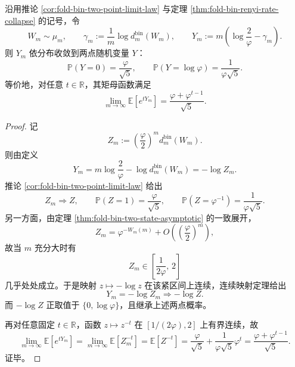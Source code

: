 \begin{theorem}\label{thm:derived-binfold-logfiber-two-point-law}
沿用推论 \ref{cor:fold-bin-two-point-limit-law} 与定理 \ref{thm:fold-bin-renyi-rate-collapse} 的记号，令
\[
W_m\sim \mu_m,
\qquad
\gamma_m:=\frac1m\log d_m^{\mathrm{bin}}(W_m),
\qquad
Y_m:=m\left(\log\frac{2}{\varphi}-\gamma_m\right).
\]
则 \(Y_m\) 依分布收敛到两点随机变量 \(Y\)：
\[
\mathbb P(Y=0)=\frac{\varphi}{\sqrt5},
\qquad
\mathbb P(Y=\log\varphi)=\frac{1}{\varphi\sqrt5}.
\]
等价地，对任意 \(t\in \mathbb R\)，其矩母函数满足
\[
\lim_{m\to\infty}\mathbb E[e^{tY_m}]
=
\frac{\varphi+\varphi^{t-1}}{\sqrt5}.
\]
\end{theorem}
\begin{proof}
记
\[
Z_m:=\left(\frac{\varphi}{2}\right)^m d_m^{\mathrm{bin}}(W_m).
\]
则由定义
\[
Y_m
=
m\log\frac{2}{\varphi}-\log d_m^{\mathrm{bin}}(W_m)
=
-\log Z_m.
\]
推论 \ref{cor:fold-bin-two-point-limit-law} 给出
\[
Z_m\Longrightarrow Z,
\qquad
\mathbb P(Z=1)=\frac{\varphi}{\sqrt5},
\qquad
\mathbb P(Z=\varphi^{-1})=\frac{1}{\varphi\sqrt5}.
\]
另一方面，由定理 \ref{thm:fold-bin-two-state-asymptotic} 的一致展开，
\[
Z_m=\varphi^{-W_m(m)}+O\!\left(\left(\frac{\varphi}{2}\right)^m\right),
\]
故当 \(m\) 充分大时有
\[
Z_m\in \left[\frac{1}{2\varphi},\,2\right]
\]
几乎处处成立。于是映射 \(z\mapsto -\log z\) 在该紧区间上连续，连续映射定理给出
\[
Y_m=-\log Z_m\Longrightarrow -\log Z.
\]
而 \(-\log Z\) 正取值于 \(\{0,\log\varphi\}\)，且继承上述两点概率。

再对任意固定 \(t\in\mathbb R\)，函数 \(z\mapsto z^{-t}\) 在 \([1/(2\varphi),2]\) 上有界连续，故
\[
\lim_{m\to\infty}\mathbb E[e^{tY_m}]
=
\lim_{m\to\infty}\mathbb E[Z_m^{-t}]
=
\mathbb E[Z^{-t}]
=
\frac{\varphi}{\sqrt5}
+\frac{1}{\varphi\sqrt5}\varphi^t
=
\frac{\varphi+\varphi^{t-1}}{\sqrt5}.
\]
证毕。
\end{proof}

